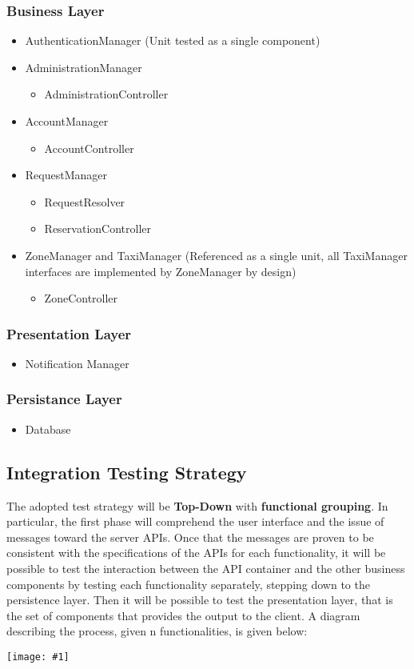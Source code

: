 \documentclass[11pt, a4paper,titlepage]{article}
\newcommand{\image}[1]{
	\begin{center}
		\noindent \texttt{[image: \#1]}
	\end{center}
}
\begin{document}
	\subsubsection{Business Layer}
	\begin{itemize}
		\item AuthenticationManager (Unit tested as a single component)
		\item AdministrationManager
		\begin{itemize}
			\item AdministrationController
		\end{itemize}
		\item AccountManager
		\begin{itemize}
			\item AccountController
		\end{itemize}
		\item RequestManager
		\begin{itemize}
			\item RequestResolver
			\item ReservationController
		\end{itemize}
		\item ZoneManager and TaxiManager (Referenced as a single unit, all TaxiManager interfaces are implemented by ZoneManager by design)
		\begin{itemize}
			\item ZoneController
		\end{itemize}
	\end{itemize}
	\subsubsection{Presentation Layer}
	\begin{itemize}
		\item Notification Manager
	\end{itemize}
	\subsubsection{Persistance Layer}
	\begin{itemize}
		\item Database
	\end{itemize}
	
	\newpage
	\subsection{Integration Testing Strategy}
	The adopted test strategy will be \textbf{ Top-Down } with \textbf{functional grouping}. 
	In particular, the first phase will comprehend the user interface and the issue of messages toward the server APIs. Once that the messages are proven to be consistent with the specifications of the APIs for each functionality, it will be possible to test the interaction between the API container and the other business components by testing each functionality separately, stepping down to the persistence layer. Then it will be possible to test the presentation layer, that is the set of components that provides the output to the client. 
	A diagram describing the process, given n functionalities, is given below:
	\image{TestingStrategy.png}
\end{document}
